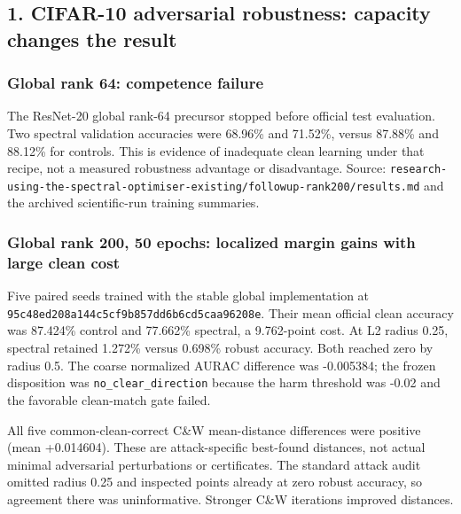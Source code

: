 \documentclass[
  british,
  10pt,
  a4paper,
]{article}
\begin{document}
\subsection{1. CIFAR-10 adversarial robustness: capacity changes the
result}\label{external-studies--cifar-10-adversarial-robustness-capacity-changes-the-result}

\subsubsection{Global rank 64: competence
failure}\label{external-studies--global-rank-64-competence-failure}

The ResNet-20 global rank-64 precursor stopped before official test
evaluation.\allowbreak{} Two spectral validation accuracies were 68.96\%
and 71.52\%, versus 87.88\% and 88.12\% for controls. This is evidence
of inadequate clean learning under that recipe, not a measured
robustness advantage or disadvantage\allowbreak{}.\allowbreak{} Source:
\texttt{research-\allowbreak{}using-\allowbreak{}the-\allowbreak{}spectral-\allowbreak{}optimiser-\allowbreak{}existing/\allowbreak{}followup-\allowbreak{}rank200/\allowbreak{}results.\allowbreak{}md}
and the archived scientific-\allowbreak{}run training summaries.

\subsubsection{Global rank 200, 50 epochs: localized margin gains with
large clean
cost}\label{external-studies--global-rank-200-50-epochs-localized-margin-gains-with-large-clean-cost}

Five paired seeds trained with the stable global implementation at
\texttt{95c48ed208a1\allowbreak{}44c5cf9b857d\allowbreak{}d6b6cd5caa96\allowbreak{}208e}.
Their mean official clean accuracy was 87.424\% control and 77.662\%
spectral, a 9.\allowbreak{}762-\allowbreak{}point cost. At L2 radius
0.25, spectral retained 1.272\% versus 0.698\% robust accuracy. Both
reached zero by radius 0.5. The coarse normalized AURAC difference was
-0.005384; the frozen disposition was
\texttt{no\_\allowbreak{}clear\_\allowbreak{}direction} because the harm
threshold was -0.02 and the favorable clean-\allowbreak{}match gate
failed.

All five common-\allowbreak{}clean-\allowbreak{}correct C\&W
mean-\allowbreak{}distance differences were positive (mean
+0.\allowbreak{}014604).\allowbreak{} These are
attack-\allowbreak{}specific best-found distances, not actual minimal
adversarial perturbations or certificates\allowbreak{}.\allowbreak{} The
standard attack audit omitted radius 0.25 and inspected points already
at zero robust accuracy, so agreement there was
uninformativ\allowbreak{}e.\allowbreak{} Stronger C\&W iterations
improved distances.
\end{document}
